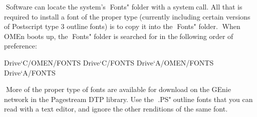 Software can locate the system's Fonts" folder with a systemcall. All that is required to install a font of the proper type(currently including certain versions of Postscript type 3 outlinefonts) is to copy it into the Fonts" folder.
When OMEn boots up, the Fonts" folder is searched for in thefollowing order of preference:

Drive`C/OMEN/FONTS
Drive`C/FONTS
Drive`A/OMEN/FONTS
Drive`A/FONTS

 
More of the proper type of fonts are available for download onthe GEnie network in the Pagestream DTP library. Use the .PS"outline fonts that you can read with a text editor, and ignore theother renditions of the same font.
 